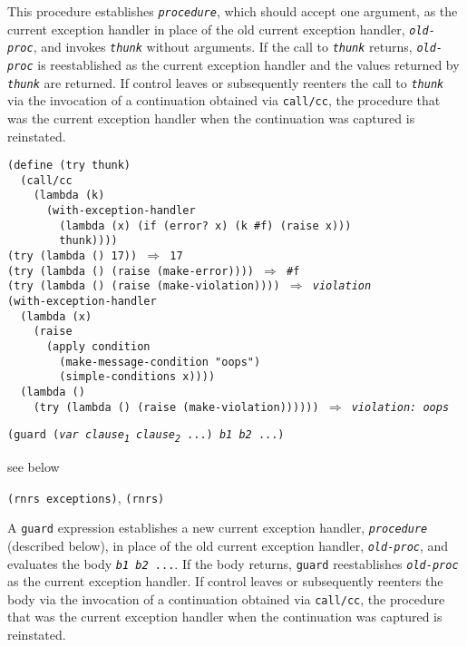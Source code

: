 This procedure establishes \texttt{\textit{procedure}}, which should accept one argument,
as the current exception handler in place of the old current exception handler,
\texttt{\textit{old-proc}}, and invokes \texttt{\textit{thunk}} without arguments.
If the call to \texttt{\textit{thunk}} returns, \texttt{\textit{old-proc}} is reestablished as
the current exception handler and the values returned by \texttt{\textit{thunk}} are
returned.
If control leaves or subsequently reenters the call to \texttt{\textit{thunk}} via the
invocation of a continuation obtained via \texttt{call/cc}, the procedure
that was the current exception handler when the continuation was
captured is reinstated.


\begin{alltt}
(define (try thunk)
  (call/cc
    (lambda (k)
      (with-exception-handler
        (lambda (x) (if (error? x) (k \#{}f) (raise x)))
        thunk))))
(try (lambda () 17)) \(\Rightarrow\) 17
(try (lambda () (raise (make-error)))) \(\Rightarrow\) \#{}f
(try (lambda () (raise (make-violation)))) \(\Rightarrow\) \textit{violation}
(with-exception-handler
  (lambda (x)
    (raise
      (apply condition
        (make-message-condition "oops")
        (simple-conditions x))))
  (lambda ()
    (try (lambda () (raise (make-violation)))))) \(\Rightarrow\) \textit{violation: oops}
\end{alltt}

\begin{description}

\label{exceptions_s8}\item[syntax] \texttt{(guard (\textit{var} \textit{clause\textsubscript{1}} \textit{clause\textsubscript{2}} ...) \textit{b1} \textit{b2} ...)}



\item[returns] see below


\item[libraries] \texttt{(rnrs exceptions)}, \texttt{(rnrs)}
\end{description}


A \texttt{guard} expression establishes a new current exception handler,
\texttt{\textit{procedure}} (described below), in place of the old current exception handler, \texttt{\textit{old-proc}},
and evaluates the body \texttt{\textit{b1} \textit{b2} ...}.
If the body returns, \texttt{guard} reestablishes \texttt{\textit{old-proc}} as the current
exception handler.
If control leaves or subsequently reenters the body via the
invocation of a continuation obtained via \texttt{call/cc}, the procedure
that was the current exception handler when the continuation was
captured is reinstated.


